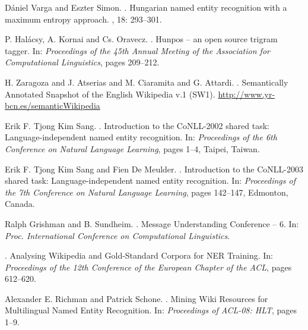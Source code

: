 \documentclass[11pt]{article}
\begin{document}
\begin{thebibliography}{}

Dániel Varga and Eszter Simon.
.
\newblock Hungarian named entity recognition with a maximum entropy approach.
, 18: 293--301.

P. Halácsy, A. Kornai and Cs. Oravecz.
.
\newblock Hunpos -- an open source trigram tagger. 
\newblock In: {\em Proceedings of the 45th Annual Meeting of the Association for Computational Linguistics}, pages 209--212.

H. Zaragoza and J. Atserias and M. Ciaramita and G. Attardi.
.
\newblock Semantically Annotated Snapshot of the English Wikipedia v.1 (SW1).
\newblock \url{http://www.yr-bcn.es/semanticWikipedia}

Erik F. Tjong Kim Sang.
.
\newblock Introduction to the CoNLL-2002 shared task: Language-independent named entity recognition.
\newblock In: {\em Proceedings of the 6th Conference on Natural Language Learning}, pages 1--4, Taipei, Taiwan.

Erik F. Tjong Kim Sang and Fien De Meulder.
.
\newblock Introduction to the CoNLL-2003 shared task: Language-independent named entity recognition. 
\newblock In: {\em Proceedings of the 7th Conference on Natural Language Learning}, pages 142--147, Edmonton, Canada.

Ralph Grishman and B. Sundheim.
.
\newblock Message Understanding Conference -- 6. 
\newblock In: {\em Proc. International Conference on Computational Linguistics}.

.
\newblock Analysing Wikipedia and Gold-Standard Corpora for NER Training.
\newblock In: {\em Proceedings of the 12th Conference of the European Chapter of the ACL}, pages 612--620.

Alexander E. Richman and Patrick Schone.
.
\newblock Mining Wiki Resources for Multilingual Named Entity Recognition.
\newblock In: {\em Proceedings of ACL-08: HLT}, pages 1--9.


\end{thebibliography}
\end{document}
